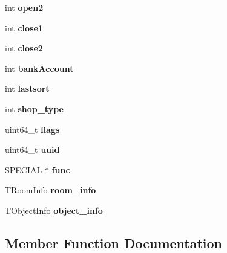 \begin{DoxyCompactItemize}
int {\bfseries open2}
\item 
\mbox{\label{structshop__data_a2536c8436c5d08b1ad307f150117ea7b}} 
int {\bfseries close1}
\item 
\mbox{\label{structshop__data_a4f69ec77440738cca95b6e2286e421f3}} 
int {\bfseries close2}
\item 
\mbox{\label{structshop__data_a50501ce14e6146eb10cbed7dfdaed64e}} 
int {\bfseries bank\+Account}
\item 
\mbox{\label{structshop__data_a13b4b2d2a2580ff1cbb205c123d76049}} 
int {\bfseries lastsort}
\item 
\mbox{\label{structshop__data_a87196704a74e60f642633ed10b4f73b2}} 
int {\bfseries shop\+\_\+type}
\item 
\mbox{\label{structshop__data_a5c351d93850bb8439a0c9534d0735cff}} 
uint64\+\_\+t {\bfseries flags}
\item 
\mbox{\label{structshop__data_ab20259105fa1b067a2834d68811517ca}} 
uint64\+\_\+t {\bfseries uuid}
\item 
\mbox{\label{structshop__data_a3b3dea70f9dbbaac8fa4f77c3287a6df}} 
S\+P\+E\+C\+I\+AL $\ast$ {\bfseries func}
\item 
\mbox{\label{structshop__data_a932c2acf370f887f3f222a7d2eadb70d}} 
T\+Room\+Info {\bfseries room\+\_\+info}
\item 
\mbox{\label{structshop__data_a7f22b0dc24fb225cdaf03985ff46f990}} 
T\+Object\+Info {\bfseries object\+\_\+info}
\end{DoxyCompactItemize}


\subsection{Member Function Documentation}
\mbox{\label{structshop__data_a9eff8b43ae8575c9af49695dd3fa3618}} 
